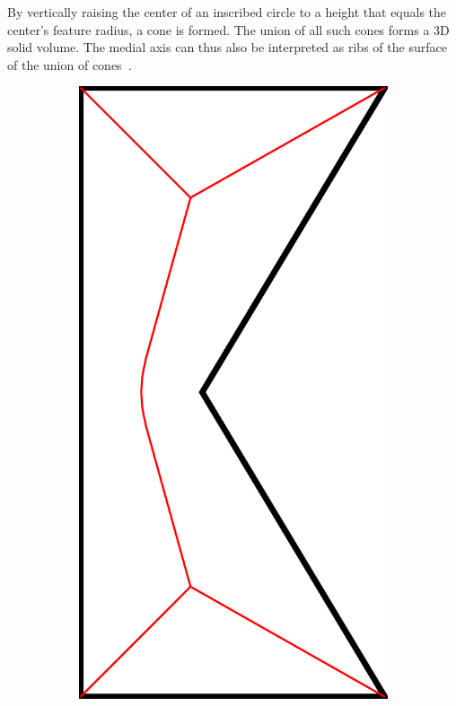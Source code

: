 By vertically raising the center of an inscribed circle to a height that equals the center's feature radius, a cone is formed. 
The union of all such cones forms a 3D solid volume. 
The medial axis can thus also be interpreted as ribs of the surface of the union of cones~\cite{blum1967transformation}.



\begin{figure}\centering
\setlength{\figwidth}{0.24\columnwidth}
\setlength{\figwidthTwo}{0.3\columnwidth}
\begin{subfigure}[t]{\figwidth}\centering
\includegraphics[height=\figwidthTwo]{sources-method-simple-skeleton-mat}

\end{subfigure}
\end{figure}
